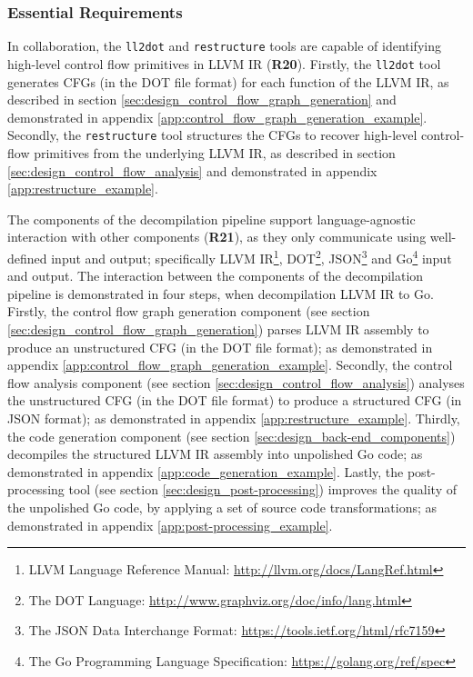 
\subsubsection{Essential Requirements}
\label{sec:eval_control_flow_recovery_tool_essential_requirements}


In collaboration, the \texttt{ll2dot} and \texttt{restructure} tools are capable of identifying high-level control flow primitives in LLVM IR (\textbf{R20}). Firstly, the \texttt{ll2dot} tool generates CFGs (in the DOT file format) for each function of the LLVM IR, as described in section \ref{sec:design_control_flow_graph_generation} and demonstrated in appendix \ref{app:control_flow_graph_generation_example}. Secondly, the \texttt{restructure} tool structures the CFGs to recover high-level control-flow primitives from the underlying LLVM IR, as described in section \ref{sec:design_control_flow_analysis} and demonstrated in appendix \ref{app:restructure_example}.


The components of the decompilation pipeline support language-agnostic interaction with other components (\textbf{R21}), as they only communicate using well-defined input and output; specifically LLVM IR\footnote{LLVM Language Reference Manual: \url{http://llvm.org/docs/LangRef.html}}, DOT\footnote{The DOT Language: \url{http://www.graphviz.org/doc/info/lang.html}}, JSON\footnote{The JSON Data Interchange Format: \url{https://tools.ietf.org/html/rfc7159}} and Go\footnote{The Go Programming Language Specification: \url{https://golang.org/ref/spec}} input and output. The interaction between the components of the decompilation pipeline is demonstrated in four steps, when decompilation LLVM IR to Go. Firstly, the control flow graph generation component (see section \ref{sec:design_control_flow_graph_generation}) parses LLVM IR assembly to produce an unstructured CFG (in the DOT file format); as demonstrated in appendix \ref{app:control_flow_graph_generation_example}. Secondly, the control flow analysis component (see section \ref{sec:design_control_flow_analysis}) analyses the unstructured CFG (in the DOT file format) to produce a structured CFG (in JSON format); as demonstrated in appendix \ref{app:restructure_example}. Thirdly, the code generation component (see section \ref{sec:design_back-end_components}) decompiles the structured LLVM IR assembly into unpolished Go code; as demonstrated in appendix \ref{app:code_generation_example}. Lastly, the post-processing tool (see section \ref{sec:design_post-processing}) improves the quality of the unpolished Go code, by applying a set of source code transformations; as demonstrated in appendix \ref{app:post-processing_example}.
